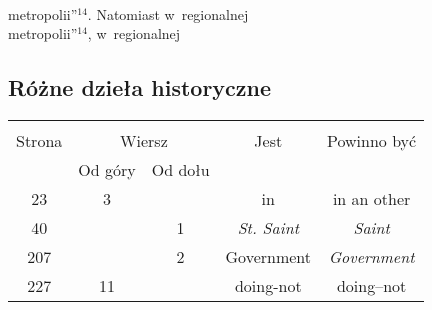 \documentclass[a4paper,11pt]{article}
\begin{document}
\noindent
{} \\
\Jest  metropolii”$^{ 14 }$. Natomiast w~regionalnej \\
\Powin metropolii”$^{ 14 }$, w~regionalnej \\

\vspace{\spaceTwo}










\subsection{Różne dzieła historyczne}

\vspace{\spaceThree}







\begin{center}

  \begin{tabular}{|c|c|c|c|c|}
    \hline
    & \multicolumn{2}{c|}{} & & \\
    Strona & \multicolumn{2}{c|}{Wiersz} & Jest
                              & Powinno być \\ \cline{2-3}
    & Od góry & Od dołu & & \\
    \hline
    23  &  3 & & in & in an other \\
    40  & &  1 & \textit{St. Saint} & \textit{Saint} \\
    207 & &  2 & Government & \textit{Government} \\
    227 & 11 & & doing-not & doing--not \\
    \hline
  \end{tabular}

\end{center}


\vspace{\spaceTwo}
\end{document}
